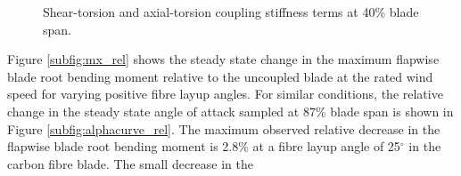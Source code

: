 \documentclass[a4paper]{jpconf}
\begin{document}
\begin{figure}[pth]
\begin{minipage}{0.35\textwidth}
\caption{\label{subfig:carbonVglass_otherstifftors_40}Shear-torsion and axial-torsion coupling stiffness terms at 40\% blade span.}
\end{minipage} 
\end{figure}
Figure \ref{subfig:mx_rel} shows the steady state change in the maximum flapwise blade root bending moment relative to the uncoupled blade at the rated wind speed for varying positive fibre layup angles. For similar conditions, the relative change in the steady state angle of attack sampled at 87\% blade span is shown in Figure \ref{subfig:alphacurve_rel}. The maximum observed relative decrease in the flapwise blade root bending moment is 2.8\% at a fibre layup angle of 25$^\circ$ in the carbon fibre blade. The small decrease in the  


\end{document}
